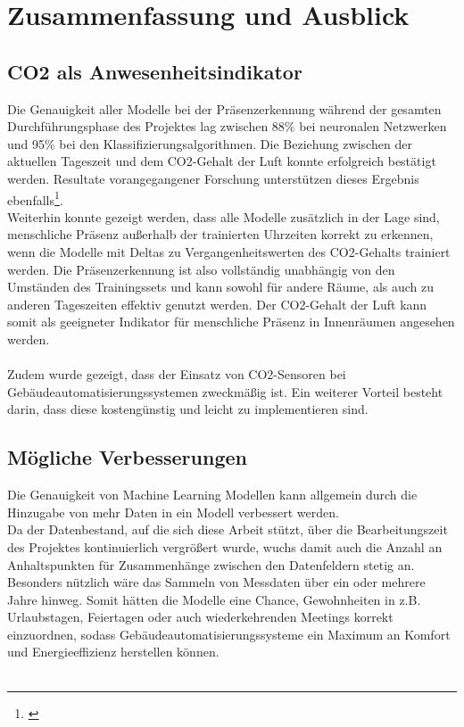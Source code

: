 \clearpage
\chapter{\textbf{Zusammenfassung und Ausblick}}\label{zusammenfassung}

\section{CO2 als Anwesenheitsindikator}
Die Genauigkeit aller Modelle bei der Präsenzerkennung während der gesamten Durchführungsphase des Projektes 
lag zwischen 88\% bei neuronalen Netzwerken und 95\% bei den Klassifizierungsalgorithmen. 
Die Beziehung zwischen der aktuellen Tageszeit und dem CO2-Gehalt der Luft konnte erfolgreich bestätigt 
werden. Resultate vorangegangener Forschung unterstützen dieses Ergebnis ebenfalls\footnote[1]{\cite{IPPR}}.\\
Weiterhin konnte gezeigt werden, dass alle Modelle zusätzlich in der Lage sind, menschliche Präsenz außerhalb
der trainierten Uhrzeiten korrekt zu erkennen, wenn die Modelle mit Deltas zu Vergangenheitswerten des 
CO2-Gehalts trainiert werden. Die Präsenzerkennung ist also vollständig unabhängig von den Umständen des
Trainingssets und kann sowohl für andere Räume, als auch zu anderen Tageszeiten effektiv genutzt werden. 
Der CO2-Gehalt der Luft kann somit als geeigneter Indikator für menschliche Präsenz in Innenräumen angesehen 
werden.\\\\
Zudem wurde gezeigt, dass der Einsatz von CO2-Sensoren bei Gebäudeautomatisierungssystemen zweckmäßig ist.
Ein weiterer Vorteil besteht darin, dass diese kostengünstig und leicht zu implementieren sind.


\section{Mögliche Verbesserungen}
Die Genauigkeit von Machine Learning Modellen kann allgemein durch die Hinzugabe von mehr Daten in ein Modell 
verbessert werden. \\
Da der Datenbestand, auf die sich diese Arbeit stützt, über die Bearbeitungszeit des Projektes 
kontinuierlich vergrößert wurde, wuchs damit auch die Anzahl an Anhaltspunkten für Zusammenhänge zwischen den 
Datenfeldern stetig an. Besonders nützlich wäre das Sammeln von Messdaten über ein oder mehrere Jahre hinweg.
Somit hätten die Modelle eine Chance, Gewohnheiten in z.B. Urlaubstagen, Feiertagen oder auch wiederkehrenden
Meetings korrekt einzuordnen, sodass Gebäudeautomatisierungssysteme ein Maximum an Komfort und Energieeffizienz
herstellen können.\\\\

